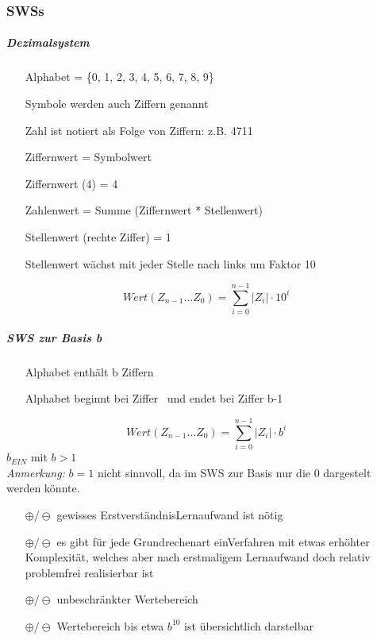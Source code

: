 \documentclass[10pt,a4paper]{scrartcl}
\begin{document}
	\subsubsection{\acfp{SWS}}
	\subparagraph{Dezimalsystem}
	\begin{itemize}
		\item[] Alphabet = \{0, 1, 2, 3, 4, 5, 6, 7, 8, 9\}
		\item[] Symbole werden auch Ziffern genannt
		\item[] Zahl ist notiert als Folge von Ziffern: z.B. 4711
		\item[] Ziffernwert = Symbolwert
		\item[] Ziffernwert (4) = 4
		\item[] Zahlenwert = Summe (Ziffernwert * Stellenwert) 
		\item[] Stellenwert (rechte Ziffer) = 1  
		\item[]Stellenwert wächst mit jeder Stelle nach links um Faktor 10
	\end{itemize}
	$$
	Wert(Z_{n-1} \dots Z_0) = \sum_{i=0}^{n-1}|Z_i|\cdot10^i
	$$
	\subparagraph{\acl{SWS} zur Basis b}
	\begin{itemize}
		\item[] Alphabet enthält b Ziffern
		\item[] Alphabet beginnt bei Ziffer \grqq\ und endet bei Ziffer \glqq b-1\grqq\
	\end{itemize} 
	$$
		Wert(Z_{n-1} \dots Z_0) = \sum_{i=0}^{n-1}|Z_i| \cdot b^i
	$$
	$b_{EIN}$ mit $b>1$\\
	\textit{Anmerkung:} $b=1$ nicht sinnvoll, da im \ac{SWS} zur Basis nur die 0 dargestelt werden könnte.
	\begin{itemize}
		\item[$ \oplus/\ominus $] gewisses \glqq Erstverständnis\grqq\/Lernaufwand ist nötig
		\item[$ \oplus/\ominus $] es gibt für jede Grundrechenart einVerfahren mit etwas erhöhter Komplexität, welches aber nach erstmaligem Lernaufwand doch relativ problemfrei realisierbar ist
		\item[$ \oplus/\ominus $] unbeschränkter Wertebereich
		\item[$ \oplus/\ominus $] Wertebereich bis etwa $b^10$ ist übersichtlich darstelbar
	\end{itemize}
\end{document}

